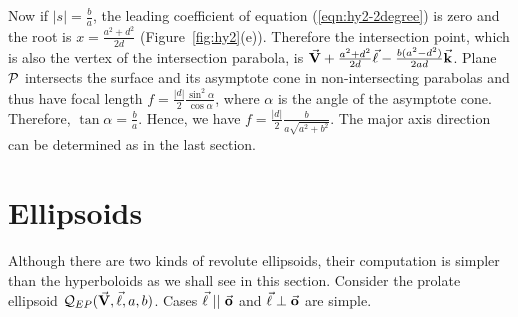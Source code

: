      Now if $|s|=\frac{b}{a}$, the leading coefficient of equation
(\ref{eqn:hy2-2degree}) is zero and the root is $x=\frac{a^2+d^2}{2d}$
(Figure~\ref{fig:hy2}(e)).  Therefore the intersection point, which is also 
the vertex of the intersection parabola, is 
$\vec{\bf V}+\frac{a^2+d^2}{2d}\vec{\bf \ell}-\frac{b(a^2-d^2)}{2ad}\vec{\bf k}$.  
Plane ${\cal P}$ intersects the surface and its asymptote cone in 
non-intersecting parabolas and thus have focal length 
$f=\frac{|d|}{2}\frac{\sin^2\alpha}{\cos\alpha}$, where $\alpha$ is the
angle of the asymptote cone.  Therefore, $\tan\alpha=\frac{b}{a}$.  Hence, we 
have $f=\frac{|d|}{2}\frac{b}{a\sqrt{a^2+b^2}}$.  The major axis direction 
can be determined as in the last section.  \QED


\section{Ellipsoids}
\label{section:ellipsoid}

     Although there are two kinds of revolute ellipsoids, their computation is 
simpler than the hyperboloids as we shall see in this section.  Consider
the prolate ellipsoid ${\cal Q}_{EP}(\vec{\bf V},\vec{\bf \ell},a,b)$.  Cases
$\vec{\bf \ell}\ ||\ \vec{\bf o}$ and $\vec{\bf \ell}\perp\vec{\bf o}$ are simple.

